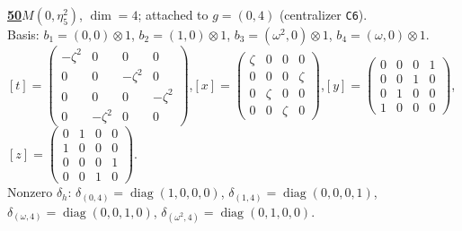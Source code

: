 \begin{samepage}\noindent\textbf{\underline{50}}\quad $M(0,\eta^{2}_{5})$, $\dim=4$; attached to $g=(0,4)$ (centralizer \texttt{C6}).\\
Basis: $b_{1}=(0,0)\otimes 1$, $b_{2}=(1,0)\otimes 1$, $b_{3}=(\omega^2,0)\otimes 1$, $b_{4}=(\omega,0)\otimes 1$.\\
$[t]=\left(\begin{smallmatrix} -\zeta^2 & 0 & 0 & 0 \\ 0 & 0 & -\zeta^2 & 0 \\ 0 & 0 & 0 & -\zeta^2 \\ 0 & -\zeta^2 & 0 & 0 \end{smallmatrix}\right)$,\quad $[x]=\left(\begin{smallmatrix} \zeta & 0 & 0 & 0 \\ 0 & 0 & 0 & \zeta \\ 0 & \zeta & 0 & 0 \\ 0 & 0 & \zeta & 0 \end{smallmatrix}\right)$,\quad $[y]=\left(\begin{smallmatrix} 0 & 0 & 0 & 1 \\ 0 & 0 & 1 & 0 \\ 0 & 1 & 0 & 0 \\ 1 & 0 & 0 & 0 \end{smallmatrix}\right)$,\quad $[z]=\left(\begin{smallmatrix} 0 & 1 & 0 & 0 \\ 1 & 0 & 0 & 0 \\ 0 & 0 & 0 & 1 \\ 0 & 0 & 1 & 0 \end{smallmatrix}\right)$.\\
Nonzero $\delta_h$: $\delta_{(0,4)}=\operatorname{diag}(1,0,0,0)$, $\delta_{(1,4)}=\operatorname{diag}(0,0,0,1)$, $\delta_{(\omega,4)}=\operatorname{diag}(0,0,1,0)$, $\delta_{(\omega^2,4)}=\operatorname{diag}(0,1,0,0)$.\end{samepage}
\medskip

